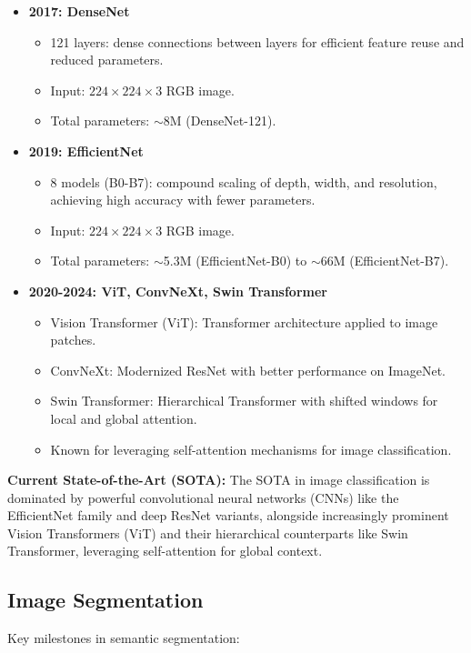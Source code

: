 \documentclass{article}
\begin{document}
\begin{itemize}[leftmargin=1.5em]
 \item \textbf{2017: DenseNet} 
  \begin{itemize}
    \item 121 layers: dense connections between layers for efficient feature reuse and reduced parameters.
    \item Input: $224 \times 224 \times 3$ RGB image.
    \item Total parameters: $\sim$8M (DenseNet-121).
  \end{itemize}
 \item \textbf{2019: EfficientNet} 
  \begin{itemize}
    \item 8 models (B0-B7): compound scaling of depth, width, and resolution, achieving high accuracy with fewer parameters.
    \item Input: $224 \times 224 \times 3$ RGB image.
    \item Total parameters: $\sim$5.3M (EfficientNet-B0) to $\sim$66M (EfficientNet-B7).
  \end{itemize}
 \item \textbf{2020-2024: ViT, ConvNeXt, Swin Transformer} 
  \begin{itemize}
    \item Vision Transformer (ViT): Transformer architecture applied to image patches.
    \item ConvNeXt: Modernized ResNet with better performance on ImageNet.
    \item Swin Transformer: Hierarchical Transformer with shifted windows for local and global attention.
    \item Known for leveraging self-attention mechanisms for image classification.
  \end{itemize}
\end{itemize}
\textbf{Current State-of-the-Art (SOTA):} The SOTA in image classification is dominated by powerful convolutional neural networks (CNNs) like the EfficientNet family and deep ResNet variants, alongside increasingly prominent Vision Transformers (ViT) and their hierarchical counterparts like Swin Transformer, leveraging self-attention for global context.

\subsection{Image Segmentation}
Key milestones in semantic segmentation:
\end{document}
